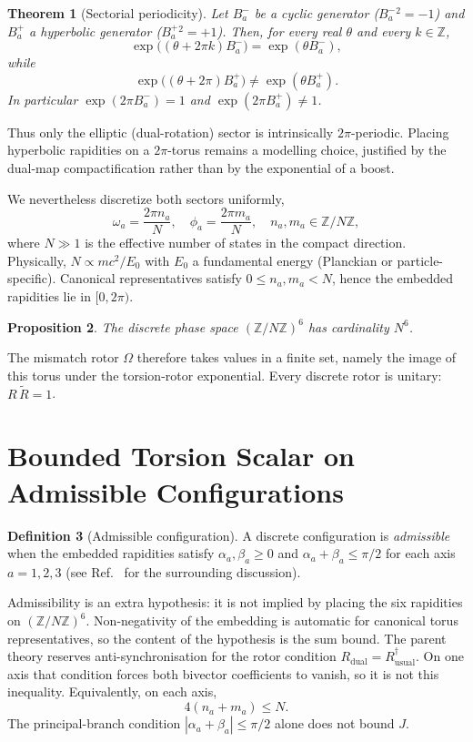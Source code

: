 \documentclass[a4paper]{article}
\newtheorem{theorem}{Theorem}[section]
\newtheorem{proposition}[theorem]{Proposition}
\theoremstyle{definition}
\newtheorem{definition}[theorem]{Definition}
\begin{document}
\begin{theorem}[Sectorial periodicity]
\label{thm:periodicity}
Let $B^-_a$ be a cyclic generator ($B^-_a{}^2=-1$) and $B^+_a$ a hyperbolic generator ($B^+_a{}^2=+1$). Then, for every real $\theta$ and every $k\in\mathbb{Z}$,
\[
\exp\bigl((\theta+2\pi k)B^-_a\bigr)=\exp(\theta B^-_a),
\]
while
\[
\exp\bigl((\theta+2\pi)B^+_a\bigr)\neq\exp(\theta B^+_a).
\]
In particular $\exp(2\pi B^-_a)=1$ and $\exp(2\pi B^+_a)\neq 1$.
\end{theorem}

Thus only the elliptic (dual-rotation) sector is intrinsically $2\pi$-periodic. Placing hyperbolic rapidities on a $2\pi$-torus remains a modelling choice, justified by the dual-map compactification rather than by the exponential of a boost.

We nevertheless discretize both sectors uniformly,
\[
\omega_a = \frac{2\pi n_a}{N}, \quad \phi_a = \frac{2\pi m_a}{N}, \quad n_a, m_a \in \mathbb{Z}/N\mathbb{Z},
\]
where $N \gg 1$ is the effective number of states in the compact direction. Physically, $N \propto m c^2 / E_0$ with $E_0$ a fundamental energy (Planckian or particle-specific). Canonical representatives satisfy $0\leq n_a,m_a<N$, hence the embedded rapidities lie in $[0,2\pi)$.

\begin{proposition}
\label{prop:torus-card}
The discrete phase space $(\mathbb{Z}/N\mathbb{Z})^6$ has cardinality $N^6$.
\end{proposition}

The mismatch rotor $\Omega$ therefore takes values in a finite set, namely the image of this torus under the torsion-rotor exponential. Every discrete rotor is unitary: $R\,\widetilde{R}=1$.

\section{Bounded Torsion Scalar on Admissible Configurations}
\label{sec:bounded}

\begin{definition}[Admissible configuration]
\label{def:admissible}
A discrete configuration is \emph{admissible} when the embedded rapidities satisfy $\alpha_a,\beta_a\geq 0$ and $\alpha_a+\beta_a\leq\pi/2$ for each axis $a=1,2,3$ (see Ref.~\cite{diophantine-paper} for the surrounding discussion).
\end{definition}

Admissibility is an extra hypothesis: it is not implied by placing the six rapidities on $(\mathbb{Z}/N\mathbb{Z})^6$. Non-negativity of the embedding is automatic for canonical torus representatives, so the content of the hypothesis is the sum bound. The parent theory reserves anti-synchronisation for the rotor condition $R_{\mathrm{dual}}=R_{\mathrm{usual}}^\dagger$. On one axis that condition forces both bivector coefficients to vanish, so it is not this inequality. Equivalently, on each axis,
\begin{equation}
\label{eq:four-le}
4(n_a+m_a)\leq N.
\end{equation}
The principal-branch condition $|\alpha_a+\beta_a|\le\pi/2$ alone does not bound $J$.
\end{document}

